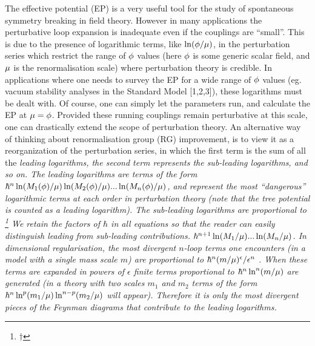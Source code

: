 The effective potential (EP) is a very useful tool for the study of
spontaneous symmetry breaking in field theory. However in many applications
the perturbative loop expansion is inadequate even if the couplings are
``small''. This is due to the presence of logarithmic terms, like
$\ln(\phi/\mu)$, in the
perturbation series which restrict the range of $\phi$ values (here $\phi$
is some generic scalar field, and $\mu$ is the renormalisation scale)
 where perturbation theory is credible.
In applications where one needs to survey the EP for a wide  range of
$\phi$ values  (eg.
vacuum stability analyses in the Standard Model [1,2,3]), these logarithms must
be
dealt with.  Of course, one can simply let the parameters run,
 and calculate the EP at $\mu=\phi$. Provided
these running couplings remain perturbative at this scale, one can
drastically extend the scope of perturbation theory. An alternative
way of thinking about renormalisation group (RG) improvement, is
to view it as a reorganization of the perturbation series, in which
the first term is the sum of all the \sl
leading logarithms, \rm the second term represents the
sub-leading logarithms, and so on. The leading logarithms  are
terms of the form $\hbar^n\ln(M_1(\phi)/\mu)\ln(M_2(\phi)/\mu)...
\ln(M_n(\phi)/\mu)$, and represent the most ``dangerous''
logarithmic terms at each order in perturbation theory (note that
the tree potential is counted as a leading logarithm). The
sub-leading logarithms are proportional to \footnote{$\dagger$}
{We retain the factors of $\hbar$ in all equations so that the
reader can easily distinguish leading from sub-leading
contributions.}
$\hbar^{n+1}
\ln(M_1/\mu)...\ln(M_n/\mu)$.
In  dimensional regularisation, the most divergent $n$-loop terms
one encounters (in a model with a single mass scale $m$) are
proportional to $\hbar^n(m/\mu)^\epsilon/\epsilon^n$
 . When these terms are expanded in powers of $\epsilon$ finite
terms proportional to $\hbar^n\ln^n(m/\mu)$ are generated (in a
theory with
two scales $m_1$ and $m_2$ terms of the form $\hbar^n\ln^p(m_1/\mu)
\ln^{n-p}(m_2/\mu)$ will appear). Therefore
it is only the most divergent pieces of the Feynman diagrams that
contribute to the leading logarithms.


